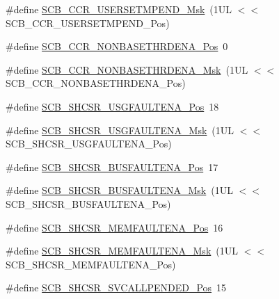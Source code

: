 \begin{DoxyCompactItemize}
\item 
\#define \mbox{\hyperlink{group___c_m_s_i_s___s_c_b_ga4cf59b6343ca962c80e1885710da90aa}{S\+C\+B\+\_\+\+C\+C\+R\+\_\+\+U\+S\+E\+R\+S\+E\+T\+M\+P\+E\+N\+D\+\_\+\+Msk}}~(1\+U\+L $<$$<$ S\+C\+B\+\_\+\+C\+C\+R\+\_\+\+U\+S\+E\+R\+S\+E\+T\+M\+P\+E\+N\+D\+\_\+\+Pos)
\item 
\#define \mbox{\hyperlink{group___c_m_s_i_s___s_c_b_gab4615f7deb07386350365b10240a3c83}{S\+C\+B\+\_\+\+C\+C\+R\+\_\+\+N\+O\+N\+B\+A\+S\+E\+T\+H\+R\+D\+E\+N\+A\+\_\+\+Pos}}~0
\item 
\#define \mbox{\hyperlink{group___c_m_s_i_s___s_c_b_gafe0f6be81b35d72d0736a0a1e3b4fbb3}{S\+C\+B\+\_\+\+C\+C\+R\+\_\+\+N\+O\+N\+B\+A\+S\+E\+T\+H\+R\+D\+E\+N\+A\+\_\+\+Msk}}~(1\+U\+L $<$$<$ S\+C\+B\+\_\+\+C\+C\+R\+\_\+\+N\+O\+N\+B\+A\+S\+E\+T\+H\+R\+D\+E\+N\+A\+\_\+\+Pos)
\item 
\#define \mbox{\hyperlink{group___c_m_s_i_s___s_c_b_gae71949507636fda388ec11d5c2d30b52}{S\+C\+B\+\_\+\+S\+H\+C\+S\+R\+\_\+\+U\+S\+G\+F\+A\+U\+L\+T\+E\+N\+A\+\_\+\+Pos}}~18
\item 
\#define \mbox{\hyperlink{group___c_m_s_i_s___s_c_b_ga056fb6be590857bbc029bed48b21dd79}{S\+C\+B\+\_\+\+S\+H\+C\+S\+R\+\_\+\+U\+S\+G\+F\+A\+U\+L\+T\+E\+N\+A\+\_\+\+Msk}}~(1\+U\+L $<$$<$ S\+C\+B\+\_\+\+S\+H\+C\+S\+R\+\_\+\+U\+S\+G\+F\+A\+U\+L\+T\+E\+N\+A\+\_\+\+Pos)
\item 
\#define \mbox{\hyperlink{group___c_m_s_i_s___s_c_b_ga3d32edbe4a5c0335f808cfc19ec7e844}{S\+C\+B\+\_\+\+S\+H\+C\+S\+R\+\_\+\+B\+U\+S\+F\+A\+U\+L\+T\+E\+N\+A\+\_\+\+Pos}}~17
\item 
\#define \mbox{\hyperlink{group___c_m_s_i_s___s_c_b_ga43e8cbe619c9980e0d1aacc85d9b9e47}{S\+C\+B\+\_\+\+S\+H\+C\+S\+R\+\_\+\+B\+U\+S\+F\+A\+U\+L\+T\+E\+N\+A\+\_\+\+Msk}}~(1\+U\+L $<$$<$ S\+C\+B\+\_\+\+S\+H\+C\+S\+R\+\_\+\+B\+U\+S\+F\+A\+U\+L\+T\+E\+N\+A\+\_\+\+Pos)
\item 
\#define \mbox{\hyperlink{group___c_m_s_i_s___s_c_b_ga685b4564a8760b4506f14ec4307b7251}{S\+C\+B\+\_\+\+S\+H\+C\+S\+R\+\_\+\+M\+E\+M\+F\+A\+U\+L\+T\+E\+N\+A\+\_\+\+Pos}}~16
\item 
\#define \mbox{\hyperlink{group___c_m_s_i_s___s_c_b_gaf084424fa1f69bea36a1c44899d83d17}{S\+C\+B\+\_\+\+S\+H\+C\+S\+R\+\_\+\+M\+E\+M\+F\+A\+U\+L\+T\+E\+N\+A\+\_\+\+Msk}}~(1\+U\+L $<$$<$ S\+C\+B\+\_\+\+S\+H\+C\+S\+R\+\_\+\+M\+E\+M\+F\+A\+U\+L\+T\+E\+N\+A\+\_\+\+Pos)
\item 
\#define \mbox{\hyperlink{group___c_m_s_i_s___s_c_b_ga2f93ec9b243f94cdd3e94b8f0bf43641}{S\+C\+B\+\_\+\+S\+H\+C\+S\+R\+\_\+\+S\+V\+C\+A\+L\+L\+P\+E\+N\+D\+E\+D\+\_\+\+Pos}}~15
$$
\end{DoxyCompactItemize}
